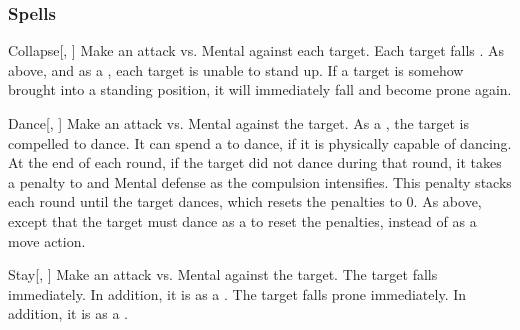 \subsubsection{Spells}


\lowercase{\hypertarget{spell:Collapse}{}}\label{spell:Collapse}
\begin{freeability}[Rank 1]{\hypertarget{spell:Collapse}{Collapse}}[, ]
Make an attack vs. Mental against each target.
\hit Each target falls .
\crit As above, and as a , each target is unable to stand up.
If a target is somehow brought into a standing position, it will immediately fall and become prone again.
\end{freeability}
\vspace{0.25em}



\lowercase{\hypertarget{spell:Dance}{}}\label{spell:Dance}
\begin{freeability}[Rank 1]{\hypertarget{spell:Dance}{Dance}}[, ]
Make an attack vs. Mental against the target.
\hit As a , the target is compelled to dance.
It can spend a  to dance, if it is physically capable of dancing.
At the end of each round, if the target did not dance during that round, it takes a  penalty to  and Mental defense as the compulsion intensifies.
This penalty stacks each round until the target dances, which resets the penalties to 0.
\crit As above, except that the target must dance as a  to reset the penalties, instead of as a move action.
\end{freeability}
\vspace{0.25em}



\lowercase{\hypertarget{spell:Stay}{}}\label{spell:Stay}
\begin{freeability}[Rank 1]{\hypertarget{spell:Stay}{Stay}}[, ]
Make an attack vs. Mental against the target.
\hit The target falls  immediately. In addition, it is  as a .
\crit The target falls prone immediately. In addition, it is  as a .
\end{freeability}
\vspace{0.25em}



